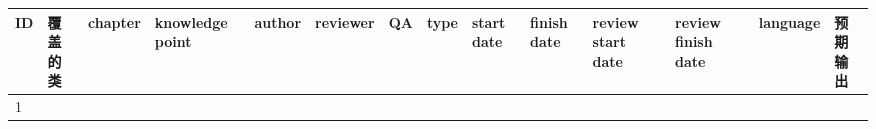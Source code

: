 \documentclass[hyperref, a4paper]{ctexart}
\begin{document}
\begin{longtable}[]{@{}llllllllllllll@{}}
\toprule
\begin{minipage}[b]{0.01\columnwidth}\raggedright
ID\strut
\end{minipage} & \begin{minipage}[b]{0.12\columnwidth}\raggedright
覆盖的类\strut
\end{minipage} & \begin{minipage}[b]{0.03\columnwidth}\raggedright
chapter\strut
\end{minipage} & \begin{minipage}[b]{0.06\columnwidth}\raggedright
knowledge point\strut
\end{minipage} & \begin{minipage}[b]{0.04\columnwidth}\raggedright
author\strut
\end{minipage} & \begin{minipage}[b]{0.04\columnwidth}\raggedright
reviewer\strut
\end{minipage} & \begin{minipage}[b]{0.04\columnwidth}\raggedright
QA\strut
\end{minipage} & \begin{minipage}[b]{0.02\columnwidth}\raggedright
type\strut
\end{minipage} & \begin{minipage}[b]{0.04\columnwidth}\raggedright
start date\strut
\end{minipage} & \begin{minipage}[b]{0.05\columnwidth}\raggedright
finish date\strut
\end{minipage} & \begin{minipage}[b]{0.07\columnwidth}\raggedright
review start date\strut
\end{minipage} & \begin{minipage}[b]{0.08\columnwidth}\raggedright
review finish date\strut
\end{minipage} & \begin{minipage}[b]{0.04\columnwidth}\raggedright
language\strut
\end{minipage} & \begin{minipage}[b]{0.02\columnwidth}\raggedright
预期输出\strut
\end{minipage}\tabularnewline
\midrule
\endhead
\begin{minipage}[t]{0.01\columnwidth}\raggedright
1\strut
\end{minipage} & \begin{minipage}[t]{0.12\columnwidth}\raggedright

\end{minipage}
\end{longtable}
\end{document}
